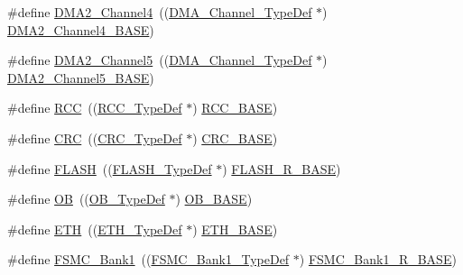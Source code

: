 \begin{DoxyCompactItemize}
\item 
\#define \hyperlink{group___peripheral__declaration_ga612b396657695191ad740b0b59bc9f12}{D\+M\+A2\+\_\+\+Channel4}~((\hyperlink{struct_d_m_a___channel___type_def}{D\+M\+A\+\_\+\+Channel\+\_\+\+Type\+Def} $\ast$) \hyperlink{openmotestm_2library_2inc_2stm32f10x__map_8h_a01b063266473f290a55047654fbbfbee}{D\+M\+A2\+\_\+\+Channel4\+\_\+\+B\+A\+SE})
\item 
\#define \hyperlink{group___peripheral__declaration_ga521c13b7d0f82a6897d47995da392750}{D\+M\+A2\+\_\+\+Channel5}~((\hyperlink{struct_d_m_a___channel___type_def}{D\+M\+A\+\_\+\+Channel\+\_\+\+Type\+Def} $\ast$) \hyperlink{openmotestm_2library_2inc_2stm32f10x__map_8h_a1eea983a5d68bf36f4d19fbb07955ca1}{D\+M\+A2\+\_\+\+Channel5\+\_\+\+B\+A\+SE})
\item 
\#define \hyperlink{group___peripheral__declaration_ga74944438a086975793d26ae48d5882d4}{R\+CC}~((\hyperlink{struct_r_c_c___type_def}{R\+C\+C\+\_\+\+Type\+Def} $\ast$) \hyperlink{openmotestm_2library_2inc_2stm32f10x__map_8h_a0e681b03f364532055d88f63fec0d99d}{R\+C\+C\+\_\+\+B\+A\+SE})
\item 
\#define \hyperlink{group___peripheral__declaration_ga4381bb54c2dbc34500521165aa7b89b1}{C\+RC}~((\hyperlink{struct_c_r_c___type_def}{C\+R\+C\+\_\+\+Type\+Def} $\ast$) \hyperlink{openmotestm_2library_2inc_2stm32f10x__map_8h_a656a447589e785594cbf2f45c835ad7e}{C\+R\+C\+\_\+\+B\+A\+SE})
\item 
\#define \hyperlink{group___peripheral__declaration_ga844ea28ba1e0a5a0e497f16b61ea306b}{F\+L\+A\+SH}~((\hyperlink{struct_f_l_a_s_h___type_def}{F\+L\+A\+S\+H\+\_\+\+Type\+Def} $\ast$) \hyperlink{openmotestm_2library_2inc_2stm32f10x__map_8h_a8e21f4845015730c5731763169ec0e9b}{F\+L\+A\+S\+H\+\_\+\+R\+\_\+\+B\+A\+SE})
\item 
\#define \hyperlink{group___peripheral__declaration_gad2d5f875cdc6d696735f20fa23a895c3}{OB}~((\hyperlink{struct_o_b___type_def}{O\+B\+\_\+\+Type\+Def} $\ast$) \hyperlink{openmotestm_2library_2inc_2stm32f10x__map_8h_ab5b5fb155f9ee15dfb6d757da1adc926}{O\+B\+\_\+\+B\+A\+SE})
\item 
\#define \hyperlink{group___peripheral__declaration_ga3a3f60de4318afbd0b3318e7a416aadc}{E\+TH}~((\hyperlink{struct_e_t_h___type_def}{E\+T\+H\+\_\+\+Type\+Def} $\ast$) \hyperlink{group___peripheral__memory__map_gad965a7b1106ece575ed3da10c45c65cc}{E\+T\+H\+\_\+\+B\+A\+SE})
\item 
\#define \hyperlink{group___peripheral__declaration_ga2a759bad07fe730c99f9e1490e646220}{F\+S\+M\+C\+\_\+\+Bank1}~((\hyperlink{struct_f_s_m_c___bank1___type_def}{F\+S\+M\+C\+\_\+\+Bank1\+\_\+\+Type\+Def} $\ast$) \hyperlink{openmotestm_2library_2inc_2stm32f10x__map_8h_ad196fe6f5e4041b201d14f43508c06d2}{F\+S\+M\+C\+\_\+\+Bank1\+\_\+\+R\+\_\+\+B\+A\+SE})

\end{DoxyCompactItemize}
